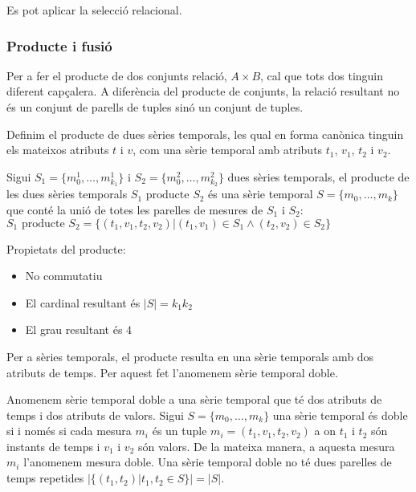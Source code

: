 Es pot aplicar la selecció relacional.






\subsubsection{Producte i fusió}


Per a fer el producte de dos conjunts relació, $A \times B$, cal que
tots dos tinguin diferent capçalera. A diferència del producte de
conjunts, la relació resultant no és un conjunt de parells de tuples
sinó un conjunt de tuples. 


Definim el producte de dues sèries temporals, les qual en forma
canònica tinguin els mateixos atributs $t$ i $v$, com una sèrie
temporal amb atributs $t_1$, $v_1$, $t_2$ i $v_2$.
\begin{definition}[producte]
  Sigui $S_1=\{m_0^1, \dotsc, m_{k_1}^1\}$ i $S_2=\{m_0^2, \dotsc,
  m_{k_2}^2\}$ dues sèries temporals, el producte de les dues sèries
  temporals $S_1 \text{ producte } S_2$ és una sèrie temporal $S=\{m_0, \dotsc,
  m_k\}$ que conté la unió de totes les parelles de mesures de $S_1$ i
  $S_2$: $S_1 \text{ producte } S_2 = \{ (t_1,v_1,t_2,v_2) | (t_1,v_1) \in S_1
  \wedge (t_2,v_2) \in S_2 \}$
\end{definition}

Propietats del producte:
\begin{itemize}
\item No commutatiu
\item El cardinal resultant és $|S|=k_1k_2$
\item El grau resultant és $4$
\end{itemize}


Per a sèries temporals, el producte resulta en una sèrie temporals amb
dos atributs de temps. Per aquest fet l'anomenem sèrie temporal doble.
\begin{definition}
  Anomenem sèrie temporal doble a una sèrie temporal que té dos
  atributs de temps i dos atributs de valors. Sigui $S =\{m_0, \dotsc,
  m_k\}$ una sèrie temporal és doble si i només si cada mesura $m_i$
  és un tuple $m_i=(t_1,v_1,t_2,v_2)$ a on $t_1$ i $t_2$ són instants
  de temps i $v_1$ i $v_2$ són valors. De la mateixa manera, a aquesta
  mesura $m_i$ l'anomenem mesura doble.  Una sèrie temporal doble no
  té dues parelles de temps repetides $|\{(t_1,t_2) | t_1,t_2\in S\}|
  = |S|$.
\end{definition}

